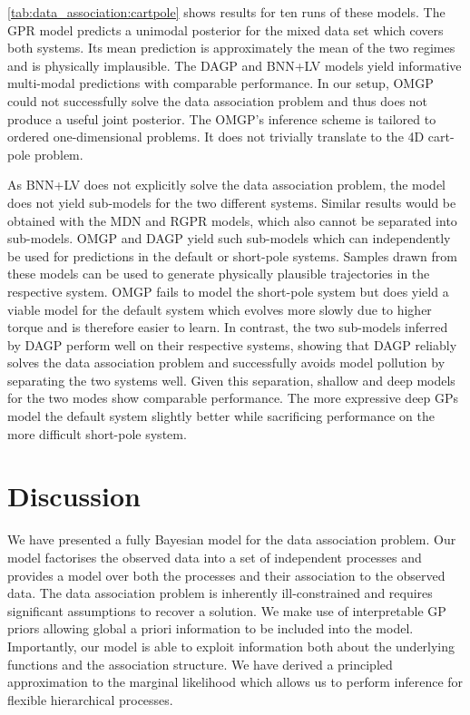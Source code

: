 \cref{tab:data_association:cartpole} shows results for ten runs of these models.
The GPR model predicts a unimodal posterior for the mixed data set which covers both systems.
Its mean prediction is approximately the mean of the two regimes and is physically implausible.
The DAGP and BNN+LV models yield informative multi-modal predictions with comparable performance.
In our setup, OMGP could not successfully solve the data association problem and thus does not produce a useful joint posterior.
The OMGP's inference scheme is tailored to ordered one-dimensional problems.
It does not trivially translate to the 4D cart-pole problem.

As BNN+LV does not explicitly solve the data association problem, the model does not yield sub-models for the two different systems.
Similar results would be obtained with the MDN and RGPR models, which also cannot be separated into sub-models.
OMGP and DAGP yield such sub-models which can independently be used for predictions in the default or short-pole systems.
Samples drawn from these models can be used to generate physically plausible trajectories in the respective system.
OMGP fails to model the short-pole system but does yield a viable model for the default system which evolves more slowly due to higher torque and is therefore easier to learn.
In contrast, the two sub-models inferred by DAGP perform well on their respective systems, showing that DAGP reliably solves the data association problem and successfully avoids model pollution by separating the two systems well.
Given this separation, shallow and deep models for the two modes show comparable performance.
The more expressive deep GPs model the default system slightly better while sacrificing performance on the more difficult short-pole system.


\section{Discussion}
\label{toc:data_association:conclusion}
We have presented a fully Bayesian model for the data association problem.
Our model factorises the observed data into a set of independent processes and provides a model over both the processes and their association to the observed data.
The data association problem is inherently ill-constrained and requires significant assumptions to recover a solution.
We make use of interpretable GP priors allowing global a priori information to be included into the model.
Importantly, our model is able to exploit information both about the underlying functions and the association structure.
We have derived a principled approximation to the marginal likelihood which allows us to perform inference for flexible hierarchical processes.

